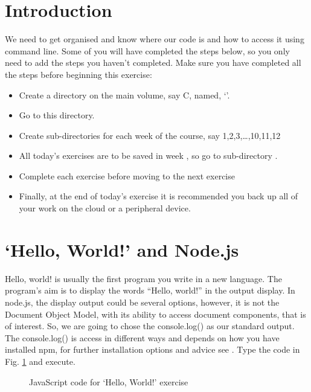 \section{Introduction}
We need to get organised and know where our code is and how to access it using command line. Some of you will have completed the steps below, so you only need to add the steps you haven't completed. Make sure you have completed all the steps before beginning this exercise:
\begin{itemize}
	\item Create a directory on the main volume, say C, named, `\moduleCode'.
	\item Go to this directory.
	\item Create sub-directories for each week of the course, say 1,2,3,\ldots,10,11,12
	\item All today's exercises are to be saved in week \theweek, so go to sub-directory \theweek. 
	\item Complete each exercise before moving to the next exercise
	\item Finally, at the end of today's exercise it is recommended you back up all of your work on the cloud or a peripheral device.
\end{itemize}


\section{`Hello, World!' and Node.js}
Hello, world! is usually the first program you write in a new language. The program's aim is to display the words ``Hello, world!'' in the output display. In node.js, the display output could be several options, however, it is not the Document Object Model, with its ability to access document components, that is of interest. So, we are going to chose the console.log() as our standard output. The console.log() is access in different ways and depends on how you have installed npm, for further installation options and advice see \url{}. Type the code in Fig. \ref{fi:ex51} and execute.

\begin{figure}[t!]
	\centering

	\caption{JavaScript code for `Hello, World!' exercise}
	\label{fi:ex51}
\end{figure} 

